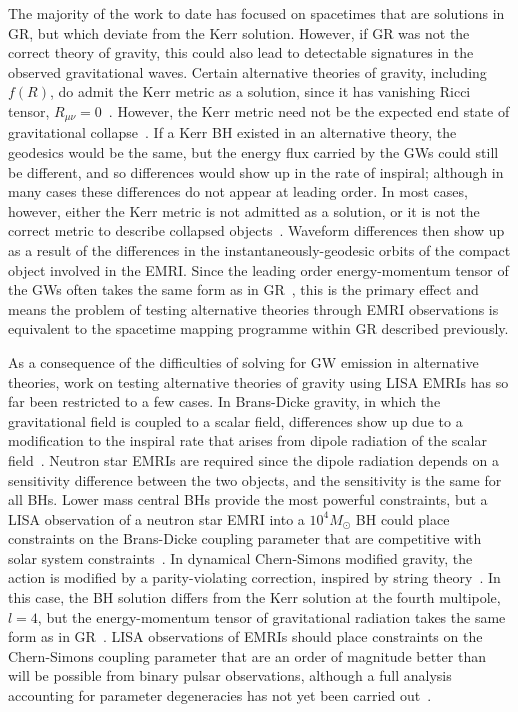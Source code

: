 \documentclass[aps,prd,amsfonts,amssymb,amsmath,nofootinbib,reprint,showpacs]{revtex4-1}
\begin{document}
The majority of the work to date has focused on spacetimes that are solutions in GR, but which deviate from the Kerr solution. However, if GR was not the correct theory of gravity, this could also lead to detectable signatures in the observed gravitational waves. Certain alternative theories of gravity, including $f(R)$, do admit the Kerr metric as a solution, since it has vanishing Ricci tensor, $R_{\mu\nu} = 0$~\cite{Psaltis2008, SYBH}. However, the Kerr metric need not be the expected end state of gravitational collapse~\cite{Barausse2008}. If a Kerr BH existed in an alternative theory, the geodesics would be the same, but the energy flux carried by the GWs could still be different, and so differences would show up in the rate of inspiral; although in many cases these differences do not appear at leading order. In most cases, however, either the Kerr metric is not admitted as a solution, or it is not the correct metric to describe collapsed objects~\cite{SYBH}. Waveform differences then show up as a result of the differences in the instantaneously-geodesic orbits of the compact object involved in the EMRI. Since the leading order energy-momentum tensor of the GWs often takes the same form as in GR~\cite{Stein2011}, this is the primary effect and means the problem of testing alternative theories through EMRI observations is equivalent to the spacetime mapping programme within GR described previously.

As a consequence of the difficulties of solving for GW emission in alternative theories, work on testing alternative theories of gravity using LISA EMRIs has so far been restricted to a few cases. In Brans-Dicke gravity, in which the gravitational field is coupled to a scalar field, differences show up due to a modification to the inspiral rate that arises from dipole radiation of the scalar field~\cite{Berti2005}. Neutron star EMRIs are required since the dipole radiation depends on a sensitivity difference between the two objects, and the sensitivity is the same for all BHs. Lower mass central BHs provide the most powerful constraints, but a LISA observation of a neutron star EMRI into a $10^4 M_{\odot}$ BH could place constraints on the Brans-Dicke coupling parameter that are competitive with solar system constraints~\cite{Berti2005}. In dynamical Chern-Simons modified gravity, the action is modified by a parity-violating correction, inspired by string theory~\cite{Alexander2008, Alexander2009a}. In this case, the BH solution differs from the Kerr solution at the fourth multipole, $l = 4$, but the energy-momentum tensor of gravitational radiation takes the same form as in GR~\cite{Sopuerta2009a}. LISA observations of EMRIs should place constraints on the Chern-Simons coupling parameter that are an order of magnitude better than will be possible from binary pulsar observations, although a full analysis accounting for parameter degeneracies has not yet been carried out~\cite{Sopuerta2009a}. 
\end{document}

